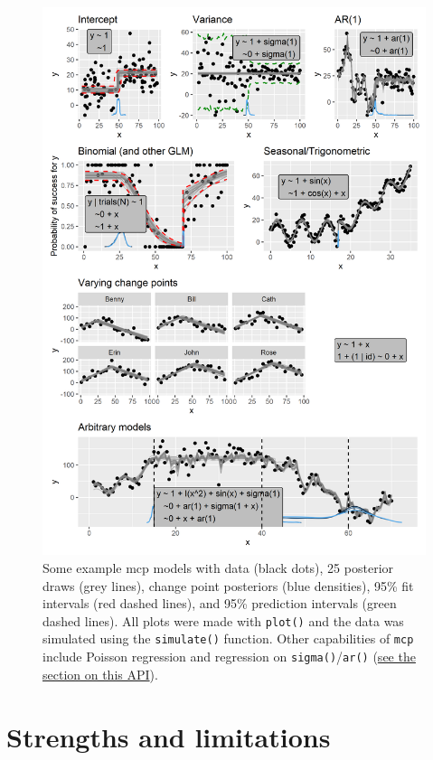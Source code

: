 \documentclass[
  american,
]{article}
\begin{document}
\begin{figure}
\includegraphics[width=5.6in]{all_plots} \caption{Some example mcp models with data (black dots), 25 posterior draws (grey lines), change point posteriors (blue densities), 95\% fit intervals (red dashed lines), and 95\% prediction intervals (green dashed lines). All plots were made with \texttt{plot()} and the data was simulated using the \texttt{simulate()} function. Other capabilities of \texttt{mcp} include Poisson regression and regression on \texttt{sigma()}/\texttt{ar()} (\protect\hyperlink{sigmaar-api}{see the section on this API}).}\label{fig:allmodels}
\end{figure}

\hypertarget{compare_packages}{%
\section{Strengths and limitations}\label{compare_packages}}
\end{document}
